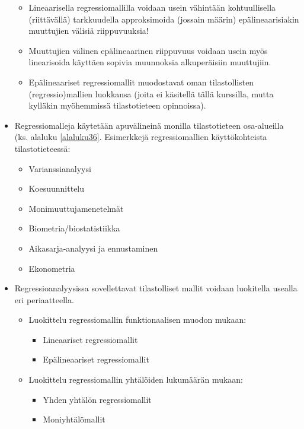 \documentclass[
]{book}
\providecommand{\tightlist}{%
  \setlength{\itemsep}{0pt}\setlength{\parskip}{0pt}}
\begin{document}
\begin{itemize}
  \begin{itemize}
  \tightlist
  \item
    Lineaarisella regressiomallilla voidaan usein vähintään kohtuullisella (riittävällä) tarkkuudella approksimoida (jossain määrin) epälineaarisiakin muuttujien välisiä riippuvuuksia!
  \item
    Muuttujien välinen epälineaarinen riippuvuus voidaan usein myös linearisoida käyttäen sopivia muunnoksia alkuperäisiin muuttujiin.
  \item
    Epälineaariset regressiomallit muodostavat oman tilastollisten (regressio)mallien luokkansa (joita ei käsitellä tällä kurssilla, mutta kylläkin myöhemmissä tilastotieteen opinnoissa).
  \end{itemize}
\item
  Regressiomalleja käytetään apuvälineinä monilla tilastotieteen osa-alueilla (ks. alaluku \ref{alaluku36}. Esimerkkejä regressiomallien käyttökohteista tilastotieteessä:

  \begin{itemize}
  \tightlist
  \item
    Varianssianalyysi
  \item
    Koesuunnittelu
  \item
    Monimuuttujamenetelmät
  \item
    Biometria/biostatistiikka
  \item
    Aikasarja-analyysi ja ennustaminen
  \item
    Ekonometria
  \end{itemize}
\item
  Regressioanalyysissa sovellettavat tilastolliset mallit voidaan luokitella usealla eri periaatteella.

  \begin{itemize}
  \tightlist
  \item
    Luokittelu regressiomallin funktionaalisen muodon mukaan:

    \begin{itemize}
    \tightlist
    \item
      Lineaariset regressiomallit
    \item
      Epälineaariset regressiomallit
    \end{itemize}
  \item
    Luokittelu regressiomallin yhtälöiden lukumäärän mukaan:

    \begin{itemize}
    \tightlist
    \item
      Yhden yhtälön regressiomallit
    \item
      Moniyhtälömallit
    \end{itemize}
  \end{itemize}
\end{itemize}
\end{document}
